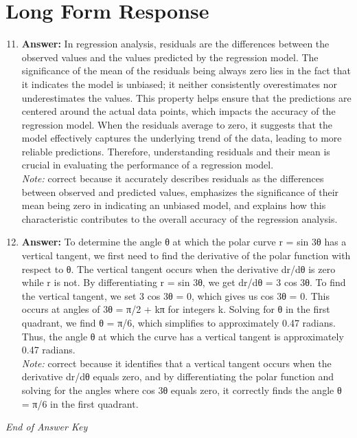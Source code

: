 \documentclass[12pt]{article}
\begin{document}
\section*{Long Form Response}
\begin{enumerate}[label=\arabic*.]
\setcounter{enumi}{10}
\item \textbf{Answer:} In regression analysis, residuals are the differences between the observed values and the values predicted by the regression model. The significance of the mean of the residuals being always zero lies in the fact that it indicates the model is unbiased; it neither consistently overestimates nor underestimates the values. This property helps ensure that the predictions are centered around the actual data points, which impacts the accuracy of the regression model. When the residuals average to zero, it suggests that the model effectively captures the underlying trend of the data, leading to more reliable predictions. Therefore, understanding residuals and their mean is crucial in evaluating the performance of a regression model.
\\ \textit{Note:} correct because it accurately describes residuals as the differences between observed and predicted values, emphasizes the significance of their mean being zero in indicating an unbiased model, and explains how this characteristic contributes to the overall accuracy of the regression analysis.
\item \textbf{Answer:} To determine the angle θ at which the polar curve r = sin 3θ has a vertical tangent, we first need to find the derivative of the polar function with respect to θ. The vertical tangent occurs when the derivative dr/dθ is zero while r is not. By differentiating r = sin 3θ, we get dr/dθ = 3 cos 3θ. To find the vertical tangent, we set 3 cos 3θ = 0, which gives us cos 3θ = 0. This occurs at angles of 3θ = π/2 + kπ for integers k. Solving for θ in the first quadrant, we find θ = π/6, which simplifies to approximately 0.47 radians. Thus, the angle θ at which the curve has a vertical tangent is approximately 0.47 radians.
\\ \textit{Note:} correct because it identifies that a vertical tangent occurs when the derivative dr/dθ equals zero, and by differentiating the polar function and solving for the angles where cos 3θ equals zero, it correctly finds the angle θ = π/6 in the first quadrant.
\end{enumerate}

\vfill
\noindent\textit{End of Answer Key}
\end{document}
